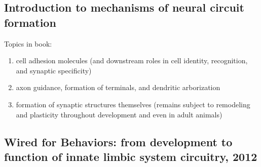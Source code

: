 \documentclass[11pt, a4paper, oneside]{article}   	%
\begin{document}
\subsection{Introduction to mechanisms of neural circuit formation}
Topics in book:
\begin{enumerate}
\item cell adhesion molecules (and downstream roles in cell identity, recognition, and synaptic specificity)
\item axon guidance, formation of terminals, and dendritic arborization
\item formation of synaptic structures themselves (remains subject to remodeling and plasticity throughout development and even in adult animals)
\end{enumerate}

\subsection{Wired for Behaviors: from development to function of innate limbic system circuitry, 2012}
\label{MNCF:wiredforbehaviors}
\end{document}
